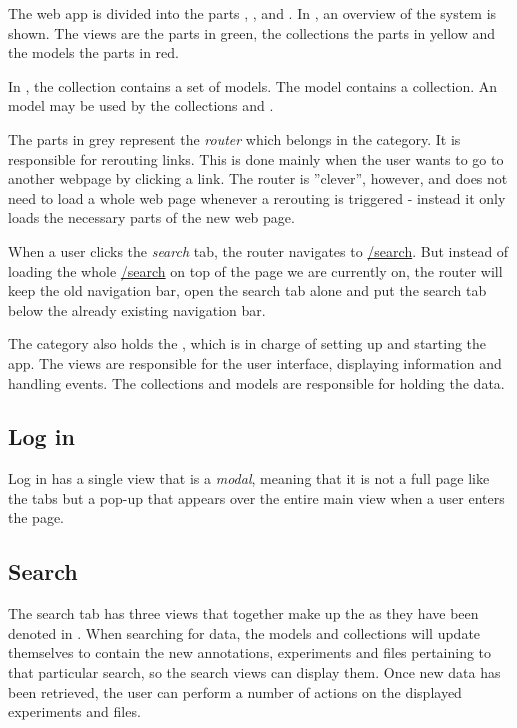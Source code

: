 The web app is divided into the parts , ,  and . In , an overview of the system is shown. The views are the parts in green, the collections the parts in yellow and the models the parts in red. 

\begin{example}
In , the collection  contains a set of  models. The model  contains a  collection. An  model may be used by the collections  and .
\end{example}

The parts in grey represent the \textit{router} which belongs in the  category. It is responsible for rerouting links. This is done mainly when the user wants to go to another webpage by clicking a link. The router is ''clever'', however, and does not need to load a whole web page whenever a rerouting is triggered - instead it only loads the necessary parts of the new web page.

\begin{example}
When a user clicks the \textit{search} tab, the router navigates to \url{/search}. But instead of loading the whole \url{/search} on top of the page we are currently on, the router will keep the old navigation bar, open the search tab alone and put the search tab below the already existing navigation bar.
\end{example}

The  category also holds the , which is in charge of setting up and starting the app. The views are responsible for the user interface, displaying information and handling events. The collections and models are responsible for holding the data.

\subsection{Log in}
Log in has a single view that is a \textit{modal}, meaning that it is not a full page like the tabs but a pop-up that appears over the entire main view when a user enters the page.

\label{sec:web_search}
\subsection{Search}
The search tab has three views that together make up the  as they have been denoted in . When searching for data, the models and collections will update themselves to contain the new annotations, experiments and files pertaining to that particular search, so the search views can display them. Once new data has been retrieved, the user can perform a number of actions on the displayed experiments and files. 

